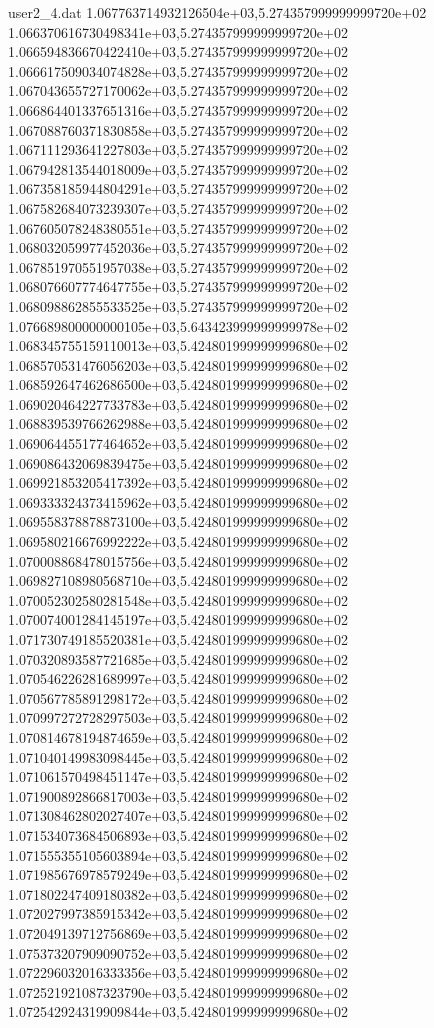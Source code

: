 \begin{filecontents}{user2_4.dat}
1.067763714932126504e+03,5.274357999999999720e+02
1.066370616730498341e+03,5.274357999999999720e+02
1.066594836670422410e+03,5.274357999999999720e+02
1.066617509034074828e+03,5.274357999999999720e+02
1.067043655727170062e+03,5.274357999999999720e+02
1.066864401337651316e+03,5.274357999999999720e+02
1.067088760371830858e+03,5.274357999999999720e+02
1.067111293641227803e+03,5.274357999999999720e+02
1.067942813544018009e+03,5.274357999999999720e+02
1.067358185944804291e+03,5.274357999999999720e+02
1.067582684073239307e+03,5.274357999999999720e+02
1.067605078248380551e+03,5.274357999999999720e+02
1.068032059977452036e+03,5.274357999999999720e+02
1.067851970551957038e+03,5.274357999999999720e+02
1.068076607774647755e+03,5.274357999999999720e+02
1.068098862855533525e+03,5.274357999999999720e+02
1.076689800000000105e+03,5.643423999999999978e+02
1.068345755159110013e+03,5.424801999999999680e+02
1.068570531476056203e+03,5.424801999999999680e+02
1.068592647462686500e+03,5.424801999999999680e+02
1.069020464227733783e+03,5.424801999999999680e+02
1.068839539766262988e+03,5.424801999999999680e+02
1.069064455177464652e+03,5.424801999999999680e+02
1.069086432069839475e+03,5.424801999999999680e+02
1.069921853205417392e+03,5.424801999999999680e+02
1.069333324373415962e+03,5.424801999999999680e+02
1.069558378878873100e+03,5.424801999999999680e+02
1.069580216676992222e+03,5.424801999999999680e+02
1.070008868478015756e+03,5.424801999999999680e+02
1.069827108980568710e+03,5.424801999999999680e+02
1.070052302580281548e+03,5.424801999999999680e+02
1.070074001284145197e+03,5.424801999999999680e+02
1.071730749185520381e+03,5.424801999999999680e+02
1.070320893587721685e+03,5.424801999999999680e+02
1.070546226281689997e+03,5.424801999999999680e+02
1.070567785891298172e+03,5.424801999999999680e+02
1.070997272728297503e+03,5.424801999999999680e+02
1.070814678194874659e+03,5.424801999999999680e+02
1.071040149983098445e+03,5.424801999999999680e+02
1.071061570498451147e+03,5.424801999999999680e+02
1.071900892866817003e+03,5.424801999999999680e+02
1.071308462802027407e+03,5.424801999999999680e+02
1.071534073684506893e+03,5.424801999999999680e+02
1.071555355105603894e+03,5.424801999999999680e+02
1.071985676978579249e+03,5.424801999999999680e+02
1.071802247409180382e+03,5.424801999999999680e+02
1.072027997385915342e+03,5.424801999999999680e+02
1.072049139712756869e+03,5.424801999999999680e+02
1.075373207909090752e+03,5.424801999999999680e+02
1.072296032016333356e+03,5.424801999999999680e+02
1.072521921087323790e+03,5.424801999999999680e+02
1.072542924319909844e+03,5.424801999999999680e+02

\end{filecontents}
